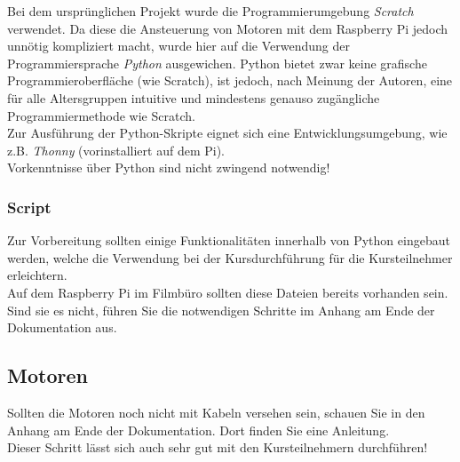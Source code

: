 Bei dem ursprünglichen Projekt wurde die Programmierumgebung \emph{Scratch} verwendet. Da diese die Ansteuerung von Motoren mit dem Raspberry Pi jedoch unnötig kompliziert macht, wurde hier auf die Verwendung der Programmiersprache \emph{Python} ausgewichen. Python bietet zwar keine grafische Programmieroberfläche (wie Scratch), ist jedoch, nach Meinung der Autoren, eine für alle Altersgruppen intuitive und mindestens genauso zugängliche Programmiermethode wie Scratch.\\

Zur Ausführung der Python-Skripte eignet sich eine Entwicklungsumgebung, wie z.B. \emph{Thonny} (vorinstalliert auf dem Pi).\\

Vorkenntnisse über Python sind nicht zwingend notwendig!

\subsubsection{Script}
Zur Vorbereitung sollten einige Funktionalitäten innerhalb von Python eingebaut werden, welche die Verwendung bei der Kursdurchführung für die Kursteilnehmer erleichtern.\\

Auf dem Raspberry Pi im Filmbüro sollten diese Dateien bereits vorhanden sein. Sind sie es nicht, führen Sie die notwendigen Schritte im Anhang am Ende der Dokumentation aus.


\subsection{Motoren}
Sollten die Motoren noch nicht mit Kabeln versehen sein, schauen Sie in den Anhang am Ende der Dokumentation. Dort finden Sie eine Anleitung.\\

Dieser Schritt lässt sich auch sehr gut mit den Kursteilnehmern durchführen!
